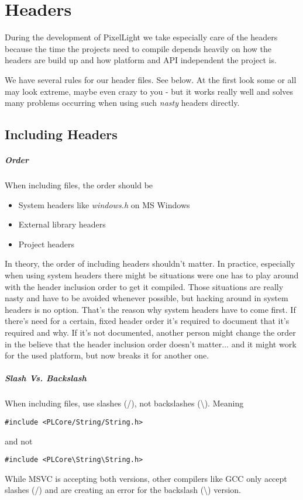 \chapter{Headers}
During the development of PixelLight we take especially care of the headers because the time the projects need to compile depends heavily on how the headers are build up and how platform and \ac{API} independent the project is.

We have several rules for our header files. See below. At the first look some or all may look extreme, maybe even crazy to you - but it works really well and solves many problems occurring when using such \emph{nasty} headers directly.



\section{Including Headers}


\paragraph{Order}
When including files, the order should be
\begin{itemize}
\item{System headers like \emph{windows.h} on MS Windows}
\item{External library headers}
\item{Project headers}
\end{itemize}
In theory, the order of including headers shouldn't matter. In practice, especially when using system headers there might be situations were one has to play around with the header inclusion order to get it compiled. Those situations are really nasty and have to be avoided whenever possible, but hacking around in system headers is no option. That's the reason why system headers have to come first. If there's need for a certain, fixed header order it's required to document that it's required and why. If it's not documented, another person might change the order in the believe that the header inclusion order doesn't matter... and it might work for the used platform, but now breaks it for another one.


\paragraph{Slash Vs. Backslash}
When including files, use slashes (/), not backslashes (\textbackslash). Meaning
\begin{lstlisting}[caption=Slash Vs. Backslash - Right]
#include <PLCore/String/String.h>
\end{lstlisting}
and not
\begin{lstlisting}[caption=Slash Vs. Backslash - Wrong]
#include <PLCore\String\String.h>
\end{lstlisting}
While \ac{MSVC} is accepting both versions, other compilers like \ac{GCC} only accept slashes (/) and are creating an error for the backslash (\textbackslash) version.



